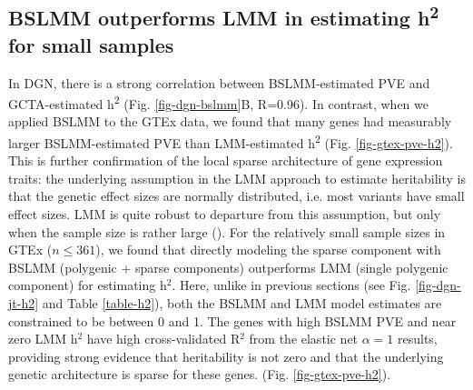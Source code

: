 \documentclass[10pt,letterpaper]{article}
\begin{document}
\subsection*{BSLMM outperforms LMM in estimating h\textsuperscript{2}  for small samples}

In DGN, there is a strong correlation between BSLMM-estimated PVE and GCTA-estimated h\textsuperscript{2} (Fig. \ref{fig-dgn-bslmm}B, R=0.96). In contrast, when we applied BSLMM to the GTEx data, we found that many genes had measurably larger BSLMM-estimated PVE than LMM-estimated h\textsuperscript{2} (Fig. \ref{fig-gtex-pve-h2}). This is further confirmation of the local sparse architecture of gene expression traits: the underlying assumption in the LMM approach to estimate heritability is that the genetic effect sizes are normally distributed, i.e. most variants have small effect sizes. LMM is quite robust to departure from this assumption, but only when the sample size is rather large (). For the relatively small sample sizes in GTEx (\(n \leq 361\)), we found that directly modeling the sparse component with BSLMM (polygenic + sparse components) outperforms LMM (single polygenic component) for estimating h$^2$. Here, unlike in previous sections (see Fig. \ref{fig-dgn-jt-h2} and Table \ref{table-h2}), both the BSLMM and LMM model estimates are constrained to be between 0 and 1. The genes with high BSLMM PVE and near zero LMM h$^2$ have high cross-validated R$^2$ from the elastic net \(\alpha=1\) results, providing strong evidence that heritability is not zero and that the underlying genetic architecture is sparse for these genes. (Fig. \ref{fig-gtex-pve-h2}).
\end{document}
